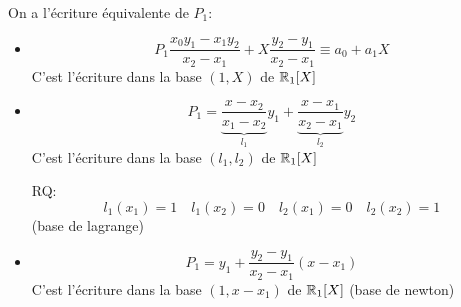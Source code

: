 \begin{remark}
    On a l'écriture équivalente de $P_1$:
   \begin{itemize}
       \item 
           \[
               P_1 \frac{x_0y_1 - x_1y_2}{x_2 - x_1} + X \frac{y_2 - y_1}{x_2 - x_1} \equiv a_0 + a_1X
           \] 
           C'est l'écriture dans la base $(1, X)$ de  $\mathbb{R}_1[X]$
       \item 
           \[
               P_1 = \underbrace{ \frac{x - x_2}{x_1 - x_2} }_{l_1}y_1 + \underbrace{ \frac{x - x_1}{x_2 - x_1} }_{l_2}y_2
           \] 
           C'est l'écriture dans la base $(l_1, l_2)$ de $\mathbb{R}_1[X]$
           \par
           RQ:
           \[
           l_1(x_1) = 1 \quad l_1(x_2) = 0 \quad l_2(x_1) = 0 \quad l_2(x_2) = 1
           \] 
           (base de lagrange)
        \item 
            \[
            P_1 = y_1 + \frac{y_2 - y_1}{x_2 - x_1}(x - x_1)
            \] 
            C'est l'écriture dans la base $(1, x - x_1)$ de $\mathbb{R}_1[X]$ (base de newton)
   \end{itemize} 
\end{remark}
